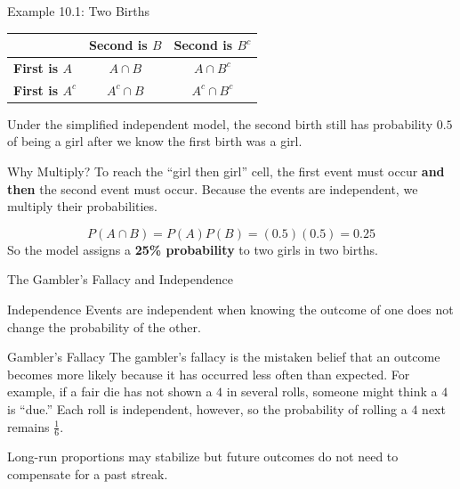 \documentclass[aspectratio=169]{beamer}
\begin{document}
\begin{frame}{Example 10.1: Two Births}
\begin{table}
\centering
\small
\begin{tabular}{lcc}
\toprule
& \textbf{Second is $B$} & \textbf{Second is $B^c$} \\
\midrule
\textbf{First is $A$} & $A\cap B$ & $A\cap B^c$ \\
\textbf{First is $A^c$} & $A^c\cap B$ & $A^c\cap B^c$ \\
\bottomrule
\end{tabular}
\end{table}
Under the simplified independent model, the second birth still has probability $0.5$ of being a girl after we know the first birth was a girl.
\vspace{0.15cm}
\begin{block}{Why Multiply?}
To reach the ``girl then girl'' cell, the first event must occur \textbf{and then} the second event must occur. Because the events are independent, we multiply their probabilities.
\end{block}
$$P(A\cap B)=P(A)P(B)=(0.5)(0.5)=\mathbf{0.25}$$
So the model assigns a \textbf{25\% probability} to two girls in two births.
\end{frame}

\begin{frame}{The Gambler's Fallacy and Independence}
\begin{block}{Independence}
Events are independent when knowing the outcome of one does not change the probability of the other.
\end{block}

\begin{alertblock}{Gambler's Fallacy}
The gambler’s fallacy is the mistaken belief that an outcome becomes more likely because it has occurred less often than expected. For example, if a fair die has not shown a $4$ in several rolls, someone might think a $4$ is “due.” Each roll is independent, however, so the probability of rolling a $4$ next remains $\frac{1}{6}$.
\end{alertblock}

Long-run proportions may stabilize but future outcomes do not need to compensate for a past streak.
\end{frame}
\end{document}
